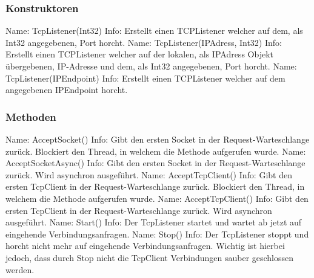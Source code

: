 \subsubsection{Konstruktoren}
Name: TcpListener(Int32)
\newline
Info: Erstellt einen TCPListener welcher auf dem, als Int32 angegebenen, Port horcht.
\newline \newline
Name: TcpListener(IPAdress, Int32)
\newline
Info:  Erstellt einen TCPListener welcher auf der lokalen, als IPAdress Objekt übergebenen, IP-Adresse und dem, als Int32 angegebenen, Port horcht.
\newline \newline
Name: TcpListener(IPEndpoint)
\newline
Info: Erstellt einen TCPListener welcher auf dem angegebenen IPEndpoint horcht.
\newline \newline
\subsubsection{Methoden}
Name: AcceptSocket()
\newline
Info: Gibt den ersten Socket in der Request-Warteschlange zurück. Blockiert den Thread, in welchem die Methode aufgerufen wurde.
\newline \newline
Name: AcceptSocketAsync()
\newline
Info: Gibt den ersten Socket in der Request-Warteschlange zurück. Wird asynchron ausgeführt.
\newline \newline
Name: AcceptTcpClient()
\newline
Info: Gibt den ersten TcpClient in der Request-Warteschlange zurück. Blockiert den Thread, in welchem die Methode aufgerufen wurde.
\newline \newline
Name: AcceptTcpClient()
\newline
Info: Gibt den ersten TcpClient in der Request-Warteschlange zurück. Wird asynchron ausgeführt.
\newline \newline
Name: Start()
\newline
Info: Der TcpListener startet und wartet ab jetzt auf eingehende Verbindungsanfragen.
\newline \newline
Name: Stop()
\newline
Info: Der TcpListener stoppt und horcht nicht mehr auf eingehende Verbindungsanfragen. Wichtig ist hierbei jedoch, dass durch Stop nicht die TcpClient Verbindungen sauber geschlossen werden.
\newline \newline
